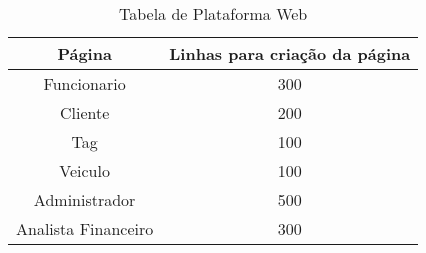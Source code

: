 \documentclass[
10pt, %
a4paper, %
oneside, %
headinclude,footinclude, %
BCOR5mm, %
]{scrartcl}
\begin{document}
\begin{table}[!h]
	\centering
	\begin{tabular}{c c}
		\hline\hline
		Página & Linhas para criação da página\\ 
		\hline\hline
		Funcionario & 300\\ 
		\hline
		Cliente & 200\\ 
		\hline
		Tag & 100\\ 
		\hline
		Veiculo & 100\\ 
		\hline
		Administrador & 500\\ 
		\hline
		Analista Financeiro & 300\\ 
		\hline
	\hline\end{tabular}
	\caption{\small{Tabela de Plataforma Web}} 
	\label{table:t2}
\end{table}

\newpage %
\end{document}
